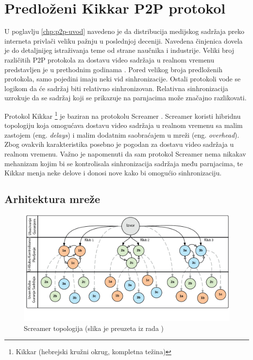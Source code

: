 \documentclass[12pt,oneside]{memoir}
\begin{document}
\chapter{Predloženi Kikkar P2P protokol}
\label{chp:p2p-protokol}
U poglavlju \ref{chp:p2p-uvod} navedeno je da distribucija medijskog sadržaja preko interneta privlači veliku pažnju u poslednjoj deceniji. Navedena činjenica dovela je do detaljnijeg istraživanja teme od strane naučnika i industrije. Veliki broj različitih P2P protokola za dostavu video sadržaja u realnom vremenu predstavljen je u prethodnim godinama \cite{Zhang:2012:SPL:2365364.2365643}. Pored velikog broja predloženih protokola, samo pojedini imaju neki vid sinhronizacije. Ostali protokoli vode se logikom da će sadržaj biti relativno sinhronizovan. Relativna sinhronizacija uzrokuje da se sadržaj koji se prikazuje na parnjacima može značajno razlikovati.


Protokol Kikkar \footnote{Kikkar (hebrejski kružni okrug, kompletna težina)} je baziran na protokolu Screamer \cite{cohenP2P}. Screamer koristi hibridnu topologiju koja omogućava dostavu video sadržaja u realnom vremenu sa malim zastojem (eng. \textit{delays}) i malim dodatnim saobraćajem u mreži (eng. \textit{overhead}). Zbog ovakvih karakteristika posebno je pogodan za dostavu video sadržaja u realnom vremenu. Važno je napomenuti da sam protokol Screamer nema nikakav mehanizam kojim bi se kontrolisala sinhronizacija sadržaja među parnjacima, te Kikkar menja neke delove i donosi nove kako bi omogućio sinhronizaciju.

\section{Arhitektura mreže}
\label{Kikkar.1}

\begin{figure}[!ht]
  \centering
  \includegraphics[width=1.05\textwidth]{slike/screamer-topology.jpg}
  \caption{Screamer topologija (slika je preuzeta iz rada \cite{ClubbingWithThePeers})}
  \label{fig:screamer-topologija}
\end{figure}
\par
\end{document}
